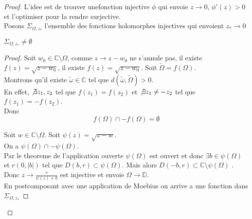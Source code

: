 \documentclass[../main.tex]{subfiles}
\begin{document}
\begin{proof}
L'idee est de trouver unefonction injective $\phi$ qui envoie $z\to 0$, $\phi'( z) >0$ et l'optimiser pour la rendre surjective.\\
Posons $\Sigma_{\Omega,z_*} $ l'ensemble des fonctions holomorphes injectives qui envoient $z_*\to 0$
\begin{lemma}
$\Sigma_{\Omega,z_*} \neq \emptyset$ 
\end{lemma}
\begin{proof}
Soit $w_0\in \mathbb{C}\setminus \Omega$, comme $z\to z-w_0$ ne s'annule pas, il existe $f( z) = \sqrt{z-w_0} $, il existe $f( z) = \sqrt{z-w_0}$. Soit $\tilde\Omega= f( \Omega) $.\\
Montrons qu'il existe $\tilde \omega\in \mathbb{C}$ tel que $d( \tilde \omega, \tilde \Omega) >0$.\\
En effet, $\not\exists z_1,z_2$ tel que $f( z_1) = f( z_2) $ et $\not\exists z_1\neq - z_2$ tel que $f( z_1) = - f( z_2) $.\\
Donc
\[ 
f( \Omega) \cap -f(  \Omega) = \emptyset
\]

Soit $w\in \mathbb{C}\setminus \Omega$. Soit $\psi( z) = \sqrt{z- w} $.\\
On a $\psi( \Omega) \cap - \psi( \Omega) $.\\
Par le theoreme de l'application ouverte $\psi( \Omega) $ est ouvert et donc $\exists b \in \psi( \Omega) $ et $r( 0, |b|) $ tel que $D( b,r) \subset \psi( \Omega) $. Mais alors $D( -b,r) \subset \mathbb{C}\setminus\psi( \Omega) $ .\\
Donc $z\to \frac{r}{\psi( z) +b}$ est injective et envoie $\Omega\to \mathbb{D}$.\\
En postcomposant avec une application de Moebius on arrive a une fonction dans $\Sigma_{\Omega, z_*} $ 	
\end{proof}

\end{proof}
\end{document}
